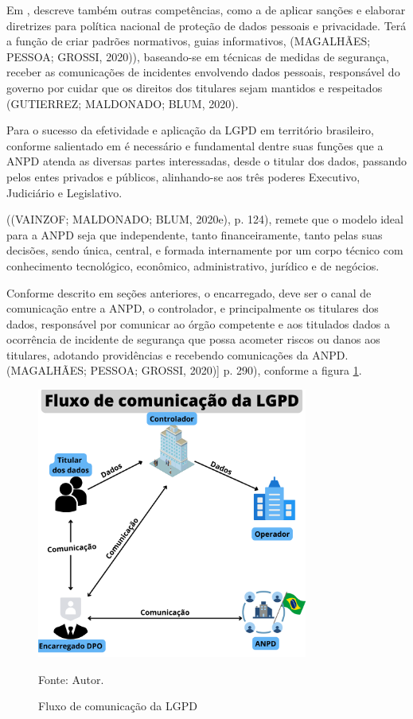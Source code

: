 \documentclass[
	12pt,				%
	openright,			%
	oneside,			%
	a4paper,			%
	english,			%
	french,				%
	spanish,			%
	brazil,				%
	]{abntex2}
\begin{document}
Em , descreve também outras competências, como a de aplicar sanções e elaborar diretrizes para política nacional de proteção de dados pessoais e privacidade. Terá a função de criar padrões normativos, guias informativos,   (MAGALHÃES; PESSOA; GROSSI, 2020)), baseando-se em técnicas de medidas de segurança, receber as comunicações de incidentes envolvendo dados pessoais, responsável do governo por cuidar que os direitos dos titulares sejam mantidos e respeitados (GUTIERREZ; MALDONADO; BLUM, 2020).

Para o sucesso da efetividade e aplicação da LGPD em território brasileiro, conforme salientado em  é necessário e fundamental dentre suas funções que a ANPD atenda as diversas partes interessadas, desde o titular dos dados, passando pelos entes privados e públicos, alinhando-se aos três poderes Executivo, Judiciário e Legislativo.

((VAINZOF; MALDONADO; BLUM, 2020e), p. 124), remete que o modelo ideal para a ANPD seja que independente, tanto financeiramente, tanto pelas suas decisões, sendo única, central, e formada internamente por um corpo técnico com conhecimento tecnológico, econômico, administrativo, jurídico e de negócios.

Conforme descrito em seções anteriores, o encarregado, deve ser o canal de comunicação entre a ANPD, o controlador, e principalmente os titulares dos dados, responsável por comunicar ao órgão competente e aos titulados dados a ocorrência de incidente de segurança que possa acometer riscos ou danos aos titulares, adotando providências e recebendo comunicações da ANPD. (MAGALHÃES; PESSOA; GROSSI, 2020)] p. 290), conforme a figura \ref{fig: Fluxo }.
\begin{figure}[ht]
    \centering
    \caption{Fluxo de comunicação da LGPD}
    \includegraphics[width=3.5in]{Images/04FluxoLGPD.png}
    
    \label{fig: Fluxo }
    \centering \small Fonte: Autor.
\end{figure}
\end{document}
